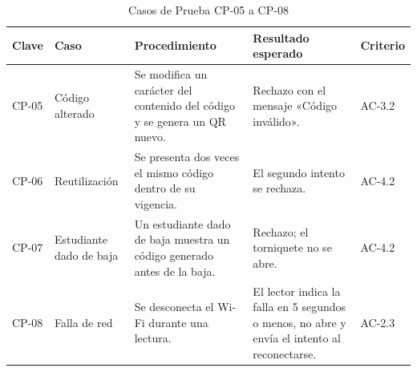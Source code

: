 \begin{table}[tbp]
	\caption{Casos de Prueba CP-05 a CP-08}
	\label{tab:cp1b}
	\small\setlength{\tabcolsep}{3pt}
	\begin{tabular}{P{1.2cm}P{2.9cm}P{4.6cm}P{4.3cm}P{1.6cm}}
		\toprule
		Clave & Caso & Procedimiento & Resultado esperado & Criterio \\
		\midrule
		CP-05 & Código alterado & Se modifica un carácter del contenido del código y se genera un QR nuevo. & Rechazo con el mensaje «Código inválido». & AC-3.2 \\
		CP-06 & Reutilización & Se presenta dos veces el mismo código dentro de su vigencia. & El segundo intento se rechaza. & AC-4.2 \\
		CP-07 & Estudiante dado de baja & Un estudiante dado de baja muestra un código generado antes de la baja. & Rechazo; el torniquete no se abre. & AC-4.2 \\
		CP-08 & Falla de red & Se desconecta el Wi-Fi durante una lectura. & El lector indica la falla en 5 segundos o menos, no abre y envía el intento al reconectarse. & AC-2.3 \\
		\bottomrule
	\end{tabular}
\end{table}

